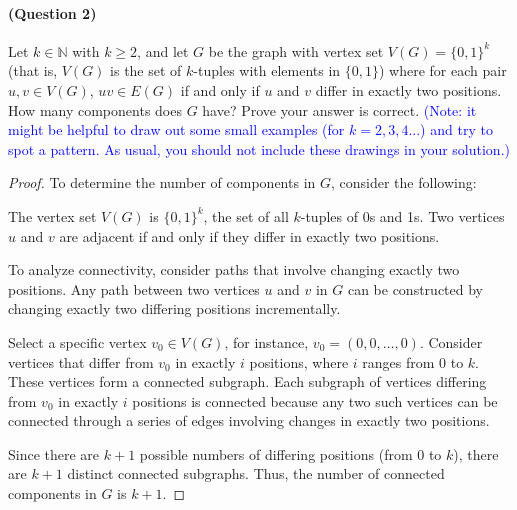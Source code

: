 \documentclass[12 pt]{article}
\begin{document}
\paragraph{(Question 2)} Let $k \in \mathbb{N}$ with $k\geq 2$, and let $G$ be the graph with vertex set $V(G) = \{0,1\}^k$ (that is, $V(G)$ is the set of $k$-tuples with elements in $\{0,1\}$) where for each pair $u,v \in V(G)$, $uv \in E(G)$ if and only if $u$ and $v$ differ in exactly two positions. How many components does $G$ have? Prove your answer is correct. \textcolor{blue}{(Note: it might be helpful to draw out some small examples (for $k =  2, 3, 4...$) and try to spot a pattern. As usual, you should not include these drawings in your solution.)}
\begin{proof}
   
To determine the number of components in \( G \), consider the following:

The vertex set \( V(G) \) is \(\{0,1\}^k\), the set of all \( k \)-tuples of 0s and 1s. Two vertices \( u \) and \( v \) are adjacent if and only if they differ in exactly two positions.

To analyze connectivity, consider paths that involve changing exactly two positions. Any path between two vertices \( u \) and \( v \) in \( G \) can be constructed by changing exactly two differing positions incrementally.

Select a specific vertex \( v_0 \in V(G) \), for instance, \( v_0 = (0,0,\ldots,0) \). Consider vertices that differ from \( v_0 \) in exactly \( i \) positions, where \( i \) ranges from 0 to \( k \). These vertices form a connected subgraph. Each subgraph of vertices differing from \( v_0 \) in exactly \( i \) positions is connected because any two such vertices can be connected through a series of edges involving changes in exactly two positions.

Since there are \( k+1 \) possible numbers of differing positions (from 0 to \( k \)), there are \( k+1 \) distinct connected subgraphs. Thus, the number of connected components in \( G \) is $k + 1$.

\end{proof}
\end{document}
